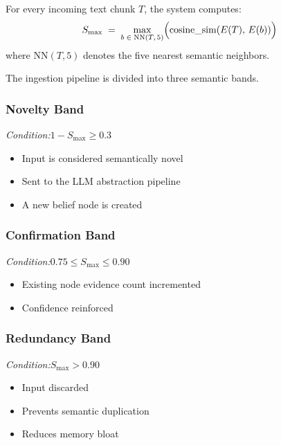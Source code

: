 \documentclass[11pt,a4paper]{article}
\begin{document}
For every incoming text chunk $T$, the system computes:
\[
    S_{\max}
    \;=\;
    \max_{b \;\in\; \mathrm{NN}(T,\,5)}
    \Bigl(\operatorname{cosine\_sim}(E(T),\,E(b))\Bigr)
\]
where $\mathrm{NN}(T,5)$ denotes the five nearest semantic neighbors.

The ingestion pipeline is divided into three semantic bands.

\subsubsection{Novelty Band}

\textit{Condition:}\quad $1 - S_{\max} \geq 0.3$

\begin{itemize}
    \item Input is considered semantically novel
    \item Sent to the LLM abstraction pipeline
    \item A new belief node is created
\end{itemize}

\subsubsection{Confirmation Band}

\textit{Condition:}\quad $0.75 \leq S_{\max} \leq 0.90$

\begin{itemize}
    \item Existing node evidence count incremented
    \item Confidence reinforced
\end{itemize}

\subsubsection{Redundancy Band}

\textit{Condition:}\quad $S_{\max} > 0.90$

\begin{itemize}
    \item Input discarded
    \item Prevents semantic duplication
    \item Reduces memory bloat
\end{itemize}
\end{document}
